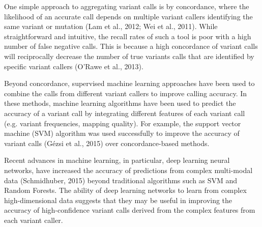 \documentclass{article}
\begin{document}
One simple approach to aggregating variant calls is by concordance, where the likelihood of an accurate call depends on multiple variant callers identifying the same variant or mutation (Lam et al., 2012; Wei et al., 2011). While straightforward and intuitive, the recall rates of such a tool is poor with a high number of false negative calls. This is because a high concordance of variant calls will reciprocally decrease the number of true variants calls that are identified by specific variant callers (O'Rawe et al., 2013).

Beyond concordance, supervised machine learning approaches have been used to combine the calls from different variant callers to improve calling accuracy. In these methods, machine learning algorithms have been used to predict the accuracy of a variant call by integrating different features of each variant call (e.g. variant frequencies, mapping quality). For example, the support vector machine (SVM) algorithm was used successfully to improve the accuracy of variant calls (Gézsi et al., 2015) over concordance-based methods. 

Recent advances in machine learning, in particular, deep learning neural networks, have increased the accuracy of predictions from complex multi-modal data (Schmidhuber, 2015) beyond traditional algorithms such as SVM and Random Forests. The ability of deep learning networks to learn from complex high-dimensional data suggests that they may be useful in improving the accuracy of high-confidence variant calls derived from the complex features from each variant caller. 
\end{document}
